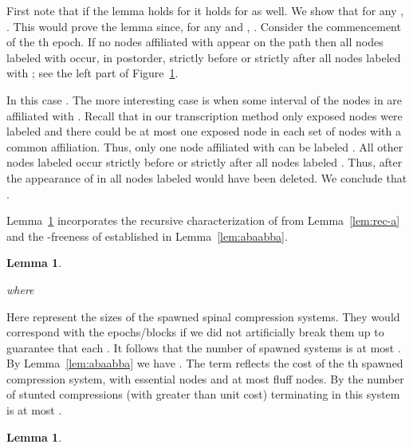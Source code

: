 \documentclass{article}
\newenvironment{proof}{\noindent {\bf Proof:}}{\hfill}
\newtheorem{lemma}[theorem]{Lemma}
\begin{document}
\begin{proof}
First note that if the lemma holds for  it holds for  as well.
We show that for any , . 
This would prove the lemma since, for any  and , 
.
Consider the commencement of the th epoch.  If no nodes affiliated with  appear on the path 
then all nodes labeled with  occur, in postorder, strictly before or strictly after all nodes labeled with ; see the left part of 
Figure~\ref{fig:abaabba}.  
\begin{figure}[h!]
\begin{center}
\end{center}
\caption{\label{fig:abaabba}}
\end{figure}
In this case
.  The more interesting case is when some interval of the nodes in  are affiliated with .
Recall that in our transcription method only exposed nodes were labeled and there could be at most one exposed node
in each set of nodes with a common affiliation.
Thus, only one node affiliated with  can be labeled .   All other nodes labeled
 occur strictly before or strictly after all nodes labeled .  Thus, after the appearance of  in  all nodes
labeled  would have been deleted.  We conclude that .
\end{proof}



Lemma~\ref{lem:rec-b} incorporates the recursive characterization of  from Lemma~\ref{lem:rec-a}
and the -freeness of  established in Lemma~\ref{lem:abaabba}.

\begin{lemma}\label{lem:rec-b}

where 

\end{lemma}

\begin{proof}
Here  represent the sizes of the spawned spinal compression systems.  They would 
correspond with the epochs/blocks if we did not artificially break them up to guarantee that each .
It follows that the number of spawned systems is at most .  By Lemma~\ref{lem:abaabba}
we have .  The term  reflects the cost of the th spawned compression system,
with  essential nodes and at most  fluff nodes.  By \cite{Sundar92} the number of stunted compressions (with greater than unit cost)
terminating in this system is at most .
\end{proof}

\begin{lemma}\label{lem:alphastar}

\end{lemma}
\end{document}
